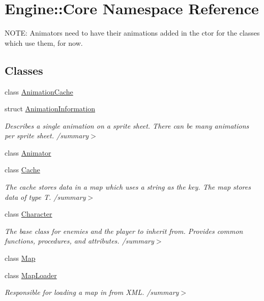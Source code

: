 \hypertarget{namespace_engine_1_1_core}{}\section{Engine\+:\+:Core Namespace Reference}
\label{namespace_engine_1_1_core}


N\+O\+TE\+: Animators need to have their animations added in the ctor for the classes which use them, for now.  


\subsection*{Classes}
\begin{DoxyCompactItemize}
\item 
class \hyperlink{class_engine_1_1_core_1_1_animation_cache}{Animation\+Cache}
\item 
struct \hyperlink{struct_engine_1_1_core_1_1_animation_information}{Animation\+Information}
\begin{DoxyCompactList}\small\item\em Describes a single animation on a sprite sheet. There can be many animations per sprite sheet. /summary$>$ \end{DoxyCompactList}\item 
class \hyperlink{class_engine_1_1_core_1_1_animator}{Animator}
\item 
class \hyperlink{class_engine_1_1_core_1_1_cache}{Cache}
\begin{DoxyCompactList}\small\item\em The cache stores data in a map which uses a string as the key. The map stores data of type T. /summary$>$ \end{DoxyCompactList}\item 
class \hyperlink{class_engine_1_1_core_1_1_character}{Character}
\begin{DoxyCompactList}\small\item\em The base class for enemies and the player to inherit from. Provides common functions, procedures, and attributes. /summary$>$ \end{DoxyCompactList}\item 
class \hyperlink{class_engine_1_1_core_1_1_map}{Map}
\item 
class \hyperlink{class_engine_1_1_core_1_1_map_loader}{Map\+Loader}
\begin{DoxyCompactList}\small\item\em Responsible for loading a map in from X\+ML. /summary$>$ \end{DoxyCompactList}\item 

\end{DoxyCompactItemize}
